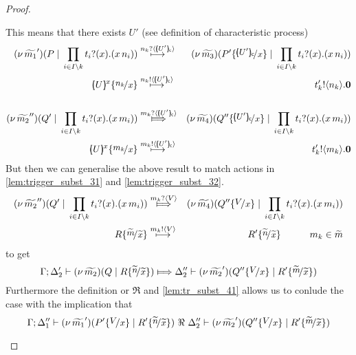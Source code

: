 \begin{proof}
\begin{enumerate}
\begin{enumerate}[i.]
							This means that there exists $U'$ (see definition of characteristic process)
							\begin{eqnarray*}
								\newsp{\widetilde{m_1}'}{P \Par \prod_{i \in I\backslash{k}} \binp{t_i}{x} (\appl{x}{n_i})}
								&\hby{\bactinp{n_k}{\omapchar{U'}}}&
								\newsp{\widetilde{m_3}}{P' \subst{\omapchar{U'}}{x} \Par \prod_{i \in I\backslash{k}} \binp{t_i}{x} (\appl{x}{n_i})}
								\\
								\mapchar{U}{x} \subst{n_k}{x}
								&\hby{\bactout{n_k}{\omapchar{U'}}}&
								\bout{t'_k}{n_k} \inact
								\\
								\\
								\newsp{\widetilde{m_2}''}{Q' \Par \prod_{i \in I\backslash{k}} \binp{t_i}{x} (\appl{x}{m_i})}
								&\Hby{\bactinp{m_k}{\omapchar{U'}}}&
								\newsp{\widetilde{m_4}}{Q'' \subst{\omapchar{U'}}{x} \Par \prod_{i \in I\backslash{k}} \binp{t_i}{x} (\appl{x}{m_i})}
								\\
								\mapchar{U}{x} \subst{m_k}{x}
								&\hby{\bactout{m_k}{\omapchar{U'}}}&
								\bout{t'_k}{m_k} \inact
							\end{eqnarray*}
							But then we can generalise the above result to match actions in \eqref{lem:trigger_subst_31}
							and \eqref{lem:trigger_subst_32}. 
							\begin{eqnarray*}
								\newsp{\widetilde{m_2}''}{Q' \Par \prod_{i \in I\backslash{k}} \binp{t_i}{x} (\appl{x}{m_i})}
								&\Hby{\bactinp{m_k}{V}}&
								\newsp{\widetilde{m_4}}{Q'' \subst{V}{x} \Par \prod_{i \in I\backslash{k}} \binp{t_i}{x} (\appl{x}{m_i})}
								\\
								R \subst{\widetilde{m}}{\widetilde{x}}
								&\hby{\bactout{m_k}{V}}&
								R' \subst{\widetilde{n}}{\widetilde{x}} \qquad \quad m_k \in \widetilde{m}
							\end{eqnarray*}
							to get
							\[
								\horel{\Gamma}{\Delta_2'}{\newsp{\widetilde{m_2}}{Q \Par R \subst{\widetilde{n}}{\widetilde{x}} }}
								{\Hby{}}
								{\Delta_2''}{\newsp{\widetilde{m_2}'}{Q'' \subst{V}{x} \Par R' \subst{\widetilde{m}}{\widetilde{x}} }}
							\]
							Furthermore the definition or $\Re$ and \eqref{lem:tr_subst_41} allows us to
							conlude the case with the implication that
							\[
								\horel{\Gamma}{\Delta_1''}{\newsp{\widetilde{m_1}'}{P'\subst{V}{x} \Par R' \subst{\widetilde{n}}{\widetilde{x}} }}
								{\ \Re\ }
								{\Delta_2''}{\newsp{\widetilde{m_2}'}{Q'' \subst{V}{x} \Par R' \subst{\widetilde{m}}{\widetilde{x}} }}
							\]
			



\end{enumerate}
\end{enumerate}
\end{proof}
